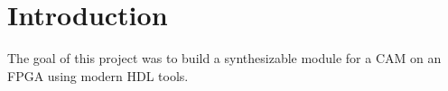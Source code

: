 \section{Introduction}
The goal of this project was to build a synthesizable module for a CAM on an FPGA using modern HDL tools. 